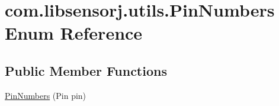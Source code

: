 \hypertarget{enumcom_1_1libsensorj_1_1utils_1_1PinNumbers}{}\section{com.\+libsensorj.\+utils.\+Pin\+Numbers Enum Reference}
\label{enumcom_1_1libsensorj_1_1utils_1_1PinNumbers}
\subsection*{Public Member Functions}
\begin{DoxyCompactItemize}
\item 
\hyperlink{enumcom_1_1libsensorj_1_1utils_1_1PinNumbers_a968a61df9cb0d58d376afe58c0e819a1}{Pin\+Numbers} (Pin pin)
\end{DoxyCompactItemize}
